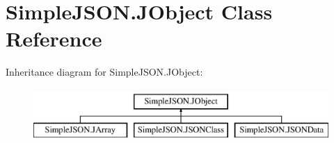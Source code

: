 \hypertarget{class_simple_j_s_o_n_1_1_j_object}{\section{Simple\+J\+S\+O\+N.\+J\+Object Class Reference}
\label{class_simple_j_s_o_n_1_1_j_object}
}
Inheritance diagram for Simple\+J\+S\+O\+N.\+J\+Object\+:\begin{figure}[H]
\begin{center}
\leavevmode
\includegraphics[height=2.000000cm]{class_simple_j_s_o_n_1_1_j_object}
\end{center}
\end{figure}
